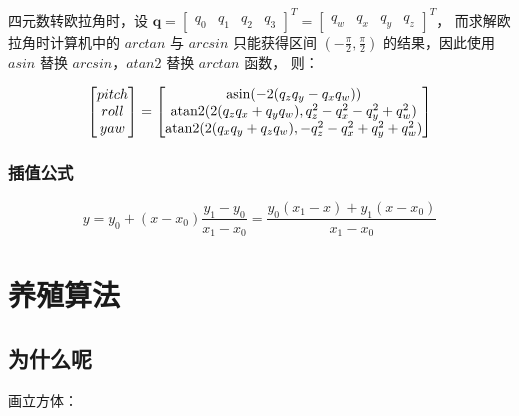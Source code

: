 四元数转欧拉角时，设 $\mathbf {q} ={\begin{bmatrix}q_{0}&q_{1}&q_{2}&q_{3}\end{bmatrix}}^{T}={\begin{bmatrix}q_{w}&q_{x}&q_{y}&q_{z}\end{bmatrix}}^{T}$，
而求解欧拉角时计算机中的 $arctan$ 与 $arcsin$ 只能获得区间 $(-\frac{\pi}{2},\frac{\pi}{2})$ 的结果，因此使用 $asin$ 替换 $arcsin$，$atan2$ 替换 $arctan$ 函数，
则：

\begin{equation}
\begin{aligned}
  \begin{bmatrix}
    pitch \\ roll \\ yaw 
  \end{bmatrix}}={
    \begin{bmatrix}
      {\mbox{asin}}(-2(q_z q_y - q_x q_w))\\
      {\mbox{atan2}}(2(q_z q_x + q_y q_w), q_z^2 - q_x^2 - q_y^2 + q_w^2)\\
      {\mbox{atan2}}(2(q_x q_y + q_z q_w), -q_z^2 - q_x^2 + q_y^2 + q_w^2)
    \end{bmatrix}
\end{aligned}
\end{equation}

\subsubsection{插值公式}

\begin{equation}
  y=y_{0}+(x-x_{0}){\frac {y_{1}-y_{0}}{x_{1}-x_{0}}}={\frac {y_{0}(x_{1}-x)+y_{1}(x-x_{0})}{x_{1}-x_{0}}}
\end{equation}


\section{养殖算法}

\subsection{为什么呢}

画立方体：

